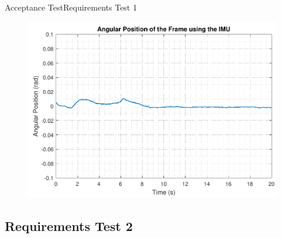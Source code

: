 \begin{frame}{Acceptance Test}{Requirements Test 1}
\begin{minipage}{\linewidth}
\begin{minipage}{0.45\linewidth}
\begin{figure}[H]
			\includegraphics[scale=.345]{Pictures/testReq1_IMU}
		\end{figure}
	\end{minipage}
\end{minipage}\linebreak
%
\end{frame}
\subsection{Requirements Test 2}

